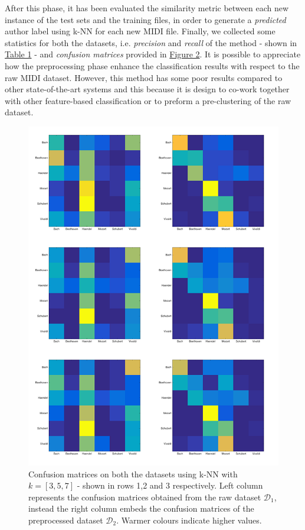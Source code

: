 \documentclass[a4paper]{article}
\begin{document}
	After this phase, it has been evaluated the similarity metric between each new instance of the test sets and the training files, in order to generate a \textit{predicted} author label using k-NN for each new MIDI file. Finally, we collected some statistics for both the datasets, i.e. \textit{precision} and \textit{recall} of the method - shown in \hyperref[tab:stats]{Table 1} - and \textit{confusion matrices} provided in \hyperref[fig:cm]{Figure 2}. It is possible to appreciate how the preprocessing phase enhance the classification results with respect to the raw MIDI dataset. However, this method has some poor results compared to other state-of-the-art systems and this because it is design to co-work together with other feature-based classification or to preform a pre-clustering of the raw dataset.
	
	\begin{figure}[]
		\centering
		\label{fig:cm}
		\includegraphics[scale=0.52]{misc/collage_dim.png}
		\caption{Confusion matrices on both the datasets using k-NN with $k = \left[3,5,7\right]$ - shown in rows 1,2 and 3 respectively. Left column represents the confusion matrices obtained from the raw dataset $\mathcal{D}_1$, instead the right column embeds the confusion matrices of the preprocessed dataset $\mathcal{D}_2$. Warmer colours indicate higher values.}
	\end{figure}
	
\end{document}
